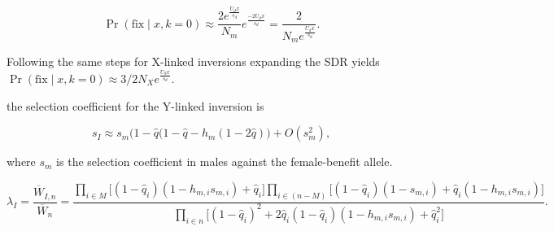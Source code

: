 \documentclass{article}
\begin{document}
\begin{equation}\label{eq:neuPfix}
	\Pr(\text{fix} \mid x, k = 0) \approx \frac{2 e^{\frac{U_d x}{s_d}}}{N_m} e^{\frac{-2U_d x}{s_d}} = \frac{2}{N_m e^{\frac{U_d x}{s_d}}}.
\end{equation}

\noindent Following the same steps for X-linked inversions expanding the SDR yields $\Pr(\text{fix} \mid x, k = 0) \approx 3/2 N_X e^{\frac{U_d x}{s_d}}$.


 the selection coefficient for the Y-linked inversion is 

\begin{equation}\label{eq:sIUnlinked}
	s_I \approx s_m (1 - \hat{q} \big( 1 - \hat{q} - h_m (1 - 2 \hat{q})\big) + O(s_{m}^{2}),
\end{equation}

\noindent where $s_m$ is the selection coefficient in males against the female-benefit allele. 


\begin{equation}\label{eq:SALambdaMultiLoc}
	\lambda_I = \frac{\overline{W}_{I,n}}{\overline{W}_{n}} = \frac{\prod_{i \in M}\big[ (1 - \hat{q}_{i})(1 - h_{m,i} s_{m,i}) + \hat{q}_{i} \big]  
	\prod_{i \in (n-M)}\big[ (1 - \hat{q}_{i})(1 - s_{m,i}) + \hat{q}_{i}(1 - h_{m,i} s_{m,i}) \big]} 
	{ \prod_{i \in n} \big[ (1 - \hat{q}_i)^2 + 2 \hat{q}_i(1 - \hat{q}_i)(1 - h_{m,i} s_{m,i}) + \hat{q}_i^2 \big]}.
\end{equation}




\newpage


\end{document}
